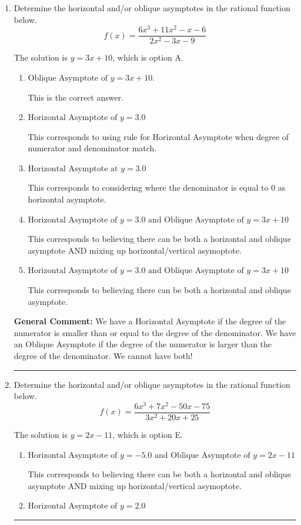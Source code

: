 \documentclass{extbook}[14pt]
\newcommand{\litem}[1]{\item #1

\rule{\textwidth}{0.4pt}}
\begin{document}
\begin{enumerate}\litem{
Determine the horizontal and/or oblique asymptotes in the rational function below.
\[ f(x) = \frac{6x^{3} +11 x^{2} -x -6}{2x^{2} -3 x -9} \]

The solution is \( y = 3x + 10 \), which is option A.\begin{enumerate}[label=\Alph*.]
\item \( \text{Oblique Asymptote of } y = 3x + 10. \)

This is the correct answer.
\item \( \text{Horizontal Asymptote of } y = 3.0  \)

This corresponds to using rule for Horizontal Asymptote when degree of numerator and denominator match.
\item \( \text{Horizontal Asymptote at } y = 3.0 \)

This corresponds to considering where the denominator is equal to 0 as horizontal asymptote.
\item \( \text{Horizontal Asymptote of } y = 3.0 \text{ and Oblique Asymptote of } y = 3x + 10 \)

This corresponds to believing there can be both a horizontal and oblique asymptote AND mixing up horizontal/vertical asymoptote.
\item \( \text{Horizontal Asymptote of } y = 3.0 \text{ and Oblique Asymptote of } y = 3x + 10 \)

This corresponds to believing there can be both a horizontal and oblique asymptote.
\end{enumerate}

\textbf{General Comment:} We have a Horizontal Asymptote if the degree of the numerator is smaller than or equal to the degree of the denominator. We have an Oblique Asymptote if the degree of the numerator is larger than the degree of the denominator. We cannot have both!
}
\litem{
Determine the horizontal and/or oblique asymptotes in the rational function below.
\[ f(x) = \frac{6x^{3} +7 x^{2} -50 x -75}{3x^{2} +20 x + 25} \]

The solution is \( y = 2x -11 \), which is option E.\begin{enumerate}[label=\Alph*.]
\item \( \text{Horizontal Asymptote of } y = -5.0 \text{ and Oblique Asymptote of } y = 2x -11 \)

This corresponds to believing there can be both a horizontal and oblique asymptote AND mixing up horizontal/vertical asymoptote.
\item \( \text{Horizontal Asymptote of } y = 2.0  \)


\end{enumerate}}
\end{enumerate}
\end{document}

